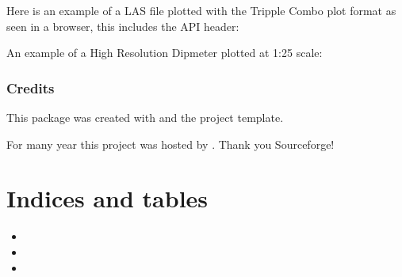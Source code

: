 \documentclass[letterpaper,10pt,english]{sphinxmanual}
\begin{document}
Here is an example of a LAS file plotted with the Tripple Combo plot format as seen in a browser, this includes the API header:

\noindent{}

An example of a High Resolution Dipmeter plotted at 1:25 scale:

\noindent{}


\subsection{Credits}
\label{\detokenize{readme:credits}}
This package was created with  and the  project template.

For many year this project was hosted by . Thank you Sourceforge!


\chapter{Indices and tables}
\label{\detokenize{index:indices-and-tables}}\label{\detokenize{index:audreyr-cookiecutter-pypackage}}\begin{itemize}
\item {} 

\item {} 

\item {} 

\end{itemize}
\end{document}
